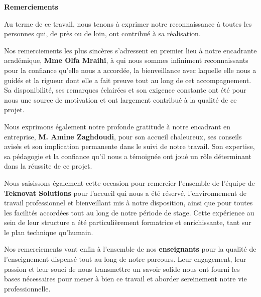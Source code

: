 \thispagestyle{plain}
\begin{center}
{\normalfont\fontsize{16}{20}\bfseries Remerciements}
\end{center}
\vspace{10pt}

\begin{center}
\begin{tcolorbox}[
  enhanced,
  breakable,
  colback=white,
  colframe=teal!70!black,
  boxrule=1.2pt,
  arc=4pt,
  left=1.2cm, right=1.2cm, top=0.6cm, bottom=0.6cm,
  width=0.85\textwidth
]

Au terme de ce travail, nous tenons à exprimer notre reconnaissance à toutes
les personnes qui, de près ou de loin, ont contribué à sa réalisation.

\vspace{6pt}

Nos remerciements les plus sincères s'adressent en premier lieu à notre
encadrante académique, \textbf{Mme Olfa Mraihi}, à qui nous sommes
infiniment reconnaissants pour la confiance qu'elle nous a accordée,
la bienveillance avec laquelle elle nous a guidés et la rigueur dont
elle a fait preuve tout au long de cet accompagnement. Sa disponibilité,
ses remarques éclairées et son exigence constante ont été pour nous une
source de motivation et ont largement contribué à la qualité de ce projet.

\vspace{6pt}

Nous exprimons également notre profonde gratitude à notre encadrant
en entreprise, \textbf{M. Amine Zaghdoudi}, pour son accueil chaleureux,
ses conseils avisés et son implication permanente dans le suivi de notre
travail. Son expertise, sa pédagogie et la confiance qu'il nous a
témoignée ont joué un rôle déterminant dans la réussite de ce projet.

\vspace{6pt}

Nous saisissons également cette occasion pour remercier l'ensemble de
l'équipe de \textbf{Teknovat Solutions} pour l'accueil qui nous a été
réservé, l'environnement de travail professionnel et bienveillant mis
à notre disposition, ainsi que pour toutes les facilités accordées
tout au long de notre période de stage. Cette expérience au sein de
leur structure a été particulièrement formatrice et enrichissante,
tant sur le plan technique qu'humain.

\vspace{6pt}

Nos remerciements vont enfin à l'ensemble de nos \textbf{enseignants}
pour la qualité de l'enseignement dispensé tout au long de notre parcours.
Leur engagement, leur passion et leur souci de nous transmettre un savoir
solide nous ont fourni les bases nécessaires pour mener à bien ce travail
et aborder sereinement notre vie professionnelle.

\end{tcolorbox}
\end{center}
